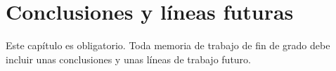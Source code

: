 \chapter{Conclusiones y líneas futuras}
\label{ch:conclusiones}

Este capítulo es obligatorio. Toda memoria de trabajo de fin de grado debe incluir unas conclusiones y unas líneas de trabajo futuro.